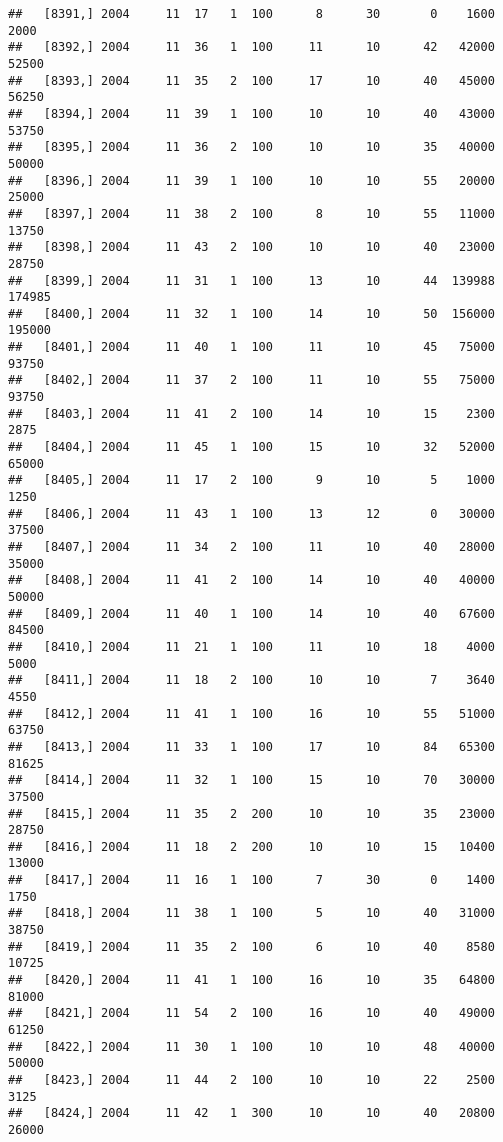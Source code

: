 \documentclass{article}\usepackage[]{graphicx}\usepackage[]{color}
\makeatletter
\newenvironment{kframe}{%
 \def\at@end@of@kframe{}%
 \ifinner\ifhmode%
  \def\at@end@of@kframe{\end{minipage}}%
  \begin{minipage}{\columnwidth}%
 \fi\fi%
 \def\FrameCommand##1{\hskip\@totalleftmargin \hskip-\fboxsep
 \colorbox{shadecolor}{##1}\hskip-\fboxsep
     \hskip-\linewidth \hskip-\@totalleftmargin \hskip\columnwidth}%
 \MakeFramed {\advance\hsize-\width
   \@totalleftmargin\z@ \linewidth\hsize
   \@setminipage}}%
 {\par\unskip\endMakeFramed%
 \at@end@of@kframe}
\newenvironment{knitrout}{}{} %
\makeatother
\begin{document}
\begin{knitrout}
\begin{kframe}
\begin{verbatim}
##   [8391,] 2004     11  17   1  100      8      30       0    1600    2000
##   [8392,] 2004     11  36   1  100     11      10      42   42000   52500
##   [8393,] 2004     11  35   2  100     17      10      40   45000   56250
##   [8394,] 2004     11  39   1  100     10      10      40   43000   53750
##   [8395,] 2004     11  36   2  100     10      10      35   40000   50000
##   [8396,] 2004     11  39   1  100     10      10      55   20000   25000
##   [8397,] 2004     11  38   2  100      8      10      55   11000   13750
##   [8398,] 2004     11  43   2  100     10      10      40   23000   28750
##   [8399,] 2004     11  31   1  100     13      10      44  139988  174985
##   [8400,] 2004     11  32   1  100     14      10      50  156000  195000
##   [8401,] 2004     11  40   1  100     11      10      45   75000   93750
##   [8402,] 2004     11  37   2  100     11      10      55   75000   93750
##   [8403,] 2004     11  41   2  100     14      10      15    2300    2875
##   [8404,] 2004     11  45   1  100     15      10      32   52000   65000
##   [8405,] 2004     11  17   2  100      9      10       5    1000    1250
##   [8406,] 2004     11  43   1  100     13      12       0   30000   37500
##   [8407,] 2004     11  34   2  100     11      10      40   28000   35000
##   [8408,] 2004     11  41   2  100     14      10      40   40000   50000
##   [8409,] 2004     11  40   1  100     14      10      40   67600   84500
##   [8410,] 2004     11  21   1  100     11      10      18    4000    5000
##   [8411,] 2004     11  18   2  100     10      10       7    3640    4550
##   [8412,] 2004     11  41   1  100     16      10      55   51000   63750
##   [8413,] 2004     11  33   1  100     17      10      84   65300   81625
##   [8414,] 2004     11  32   1  100     15      10      70   30000   37500
##   [8415,] 2004     11  35   2  200     10      10      35   23000   28750
##   [8416,] 2004     11  18   2  200     10      10      15   10400   13000
##   [8417,] 2004     11  16   1  100      7      30       0    1400    1750
##   [8418,] 2004     11  38   1  100      5      10      40   31000   38750
##   [8419,] 2004     11  35   2  100      6      10      40    8580   10725
##   [8420,] 2004     11  41   1  100     16      10      35   64800   81000
##   [8421,] 2004     11  54   2  100     16      10      40   49000   61250
##   [8422,] 2004     11  30   1  100     10      10      48   40000   50000
##   [8423,] 2004     11  44   2  100     10      10      22    2500    3125
##   [8424,] 2004     11  42   1  300     10      10      40   20800   26000

\end{verbatim}
\end{kframe}
\end{knitrout}
\end{document}
